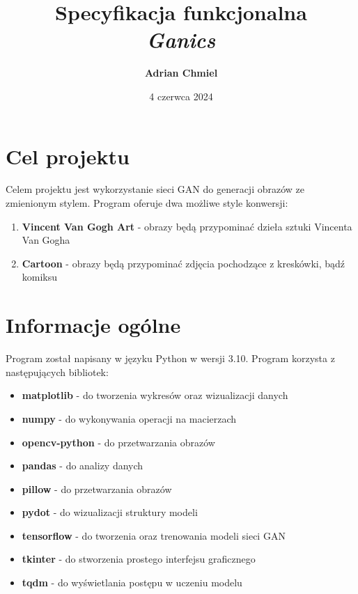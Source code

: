 \documentclass{article}
\begin{document}
\title{\textbf{Specyfikacja funkcjonalna}
\\ \large{\textit{Ganics}}}
\author{\textbf{Adrian Chmiel}}
\date{4 czerwca 2024}
\maketitle

\section{Cel projektu}
Celem projektu jest wykorzystanie sieci GAN do generacji obrazów ze zmienionym stylem. Program oferuje dwa możliwe style konwersji:
\begin{enumerate}[label=\arabic*.]
    \setlength\itemsep{0pt}
    \item \textbf{Vincent Van Gogh Art} - obrazy będą przypominać dzieła sztuki Vincenta Van Gogha
    \item \textbf{Cartoon} - obrazy będą przypominać zdjęcia pochodzące z kreskówki, bądź komiksu
\end{enumerate}

\section{Informacje ogólne}
Program został napisany w języku Python w wersji 3.10. Program korzysta z następujących bibliotek:
\begin{itemize}
    \setlength\itemsep{0pt}
    \item \textbf{matplotlib} - do tworzenia wykresów oraz wizualizacji danych
    \item \textbf{numpy} - do wykonywania operacji na macierzach
    \item \textbf{opencv-python} - do przetwarzania obrazów
    \item \textbf{pandas} - do analizy danych
    \item \textbf{pillow} - do przetwarzania obrazów
    \item \textbf{pydot} - do wizualizacji struktury modeli
    \item \textbf{tensorflow} - do tworzenia oraz trenowania modeli sieci GAN
    \item \textbf{tkinter} - do stworzenia prostego interfejsu graficznego
    \item \textbf{tqdm} - do wyświetlania postępu w uczeniu modelu
\end{itemize}
\end{document}
